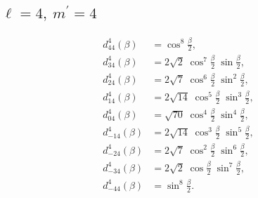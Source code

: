 \documentclass[%
aps,
prd,
amssymb,
amsmath,
amsfonts,
eqsecnum,
showpacs,
nofootinbib,
floatfix,
twocolumn,
twoside,
a4paper,
superscriptaddress
]{revtex4-1}
\newcommand{\botwo}{\frac{\beta}{2}}
\begin{document}
\subsection{\texorpdfstring{$\ell = 4,  \:m^{\prime} = 4$}{l=4,m'=4}}
\begin{align*}
    d^4_{44} (\beta) &= \cos^8 \botwo, \\
    d^4_{34} (\beta) &= 2 \sqrt{2} \;  \cos^7 \botwo \; \sin \botwo, \\
    d^4_{24} (\beta) &= 2 \sqrt{7} \;  \cos^6 \botwo \; \sin^2 \botwo, \\
    d^4_{14} (\beta) &= 2 \sqrt{14} \; \cos^5 \botwo \; \sin^3 \botwo, \\
    d^4_{04} (\beta) &= \sqrt{70} \; \cos^4 \botwo \; \sin^4 \botwo, \\
    d^4_{-14} (\beta) &= 2 \sqrt{14} \;  \cos^3 \botwo \; \sin^5 \botwo, \\
    d^4_{-24} (\beta) &= 2 \sqrt{7} \;  \cos^2 \botwo \; \sin^6 \botwo, \\
    d^4_{-34} (\beta) &= 2 \sqrt{2} \;  \cos \botwo \; \sin^7 \botwo, \\
    d^4_{-44} (\beta) &= \sin^8 \botwo.
\end{align*}
\end{document}

